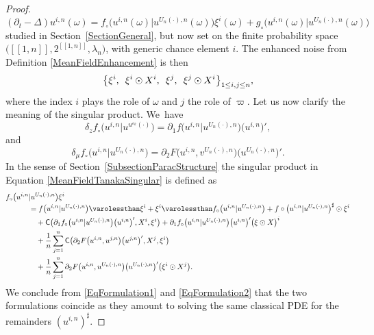 \documentclass[10pt]{amsart}
\theoremstyle{definition}
\let\epsilon\varepsilon
\begin{document}
\begin{proof}
\begin{equation}\label{MeanFieldTanakaSingular}
(\partial_t-\Delta)u^{i,n}(\omega) = f_\circ\bigl(u^{i,n}(\omega) \big\vert u^{U_n(\cdot),n}(\omega) \bigr)\xi^i(\omega) + g_\circ\bigl(u^{i,n}(\omega) \big\vert u^{U_n(\cdot),n}(\omega) \bigr)
\end{equation}
studied in Section~\ref{SectionGeneral}, but now set on the finite probability space $\bigl([\![ 1,n]\!],2^{[\![ 1,n]\!]},\lambda_n\bigr)$, with generic chance element $i$. The enhanced noise from Definition \ref{MeanFieldEnhancement} is then
\[
\bigl\{ \xi^i,\enskip \xi^i\odot X^i,\enskip \xi^j, \enskip \xi^j \odot X^i \bigr\}_{1\leq i,j\leq n},
\]
where the index $i$ plays the role of $\omega$ and $j$ the role of $\varpi$. Let us now clarify the meaning of the singular product. We~have
\[
\delta_z f_\circ\bigl(u^{i,n} \vert u^{u^{\epsilon_k}(\cdot)}\bigr) = \partial_1 f\bigl(u^{i,n} \vert u^{U_n(\cdot),n} \bigr)\bigl(u^{i,n}\bigr)',
\]
and
\[
\delta_\mu f_\circ\bigl(u^{i,n} \vert u^{U_n(\cdot),n}\bigr) = \partial_2 F\bigl(u^{i,n}, v^{U_n(\cdot),n}\bigr)\bigl(u^{U_n(\cdot),n}\bigr)'.
\]
In the sense of Section~\ref{SubsectionParacStructure} the singular product in Equation \eqref{MeanFieldTanakaSingular} is defined as
\begin{align} \label{EqFormulation2}
f_\circ\bigl(u^{i,n} &\vert u^{U_n(\cdot),n} \bigr)\xi^i \notag\\[-3pt]
&= f\bigl(u^{i,n} \vert u^{U_n(\cdot),n} \bigr) \varolessthan \xi^i + \xi^i \varolessthan f_\circ\bigl(u^{i,n} \vert u^{U_n(\cdot),n} \bigr) + f\circ\bigl(u^{i,n} \vert u^{U_n(\cdot),n} \bigr)^\sharp\odot\xi^i \notag\\
&\quad+{\sf{C}}\bigl( \partial_1 f_\circ\bigl(u^{i,n} \vert u^{U_n(\cdot),n} \bigr)\bigl(u^{i,n}\bigr)',X^i,\xi^i \bigr) + \partial_1 f_\circ\bigl(u^{i,n} \vert u^{U_n(\cdot),n} \bigr)\bigl(u^{i,n}\bigr)'\bigl(\xi\odot X\bigr)^i \\
&\quad+\frac{1}{n}\sum_{j=1}^n \mathsf{C}\bigl( \partial_2 F\bigl(u^{i,n},u^{j,n}\bigr)\bigl(u^{j,n}\bigr)', X^j,\xi^i \bigr)\notag \\
&\quad+\frac{1}{n}\sum_{j=1}^n \partial_2 F\bigl(u^{i,n},u^{U_n(\cdot),n}\bigr)\bigl(u^{U_n(\cdot),n}\bigr)'\bigl(\xi^i\odot X^j\bigr).\notag
\end{align}
We conclude from \eqref{EqFormulation1} and \eqref{EqFormulation2} that the two formulations coincide as they amount to solving the same classical PDE for the remainders $(u^{i,n})^\sharp$.
\end{proof}
\end{document}
